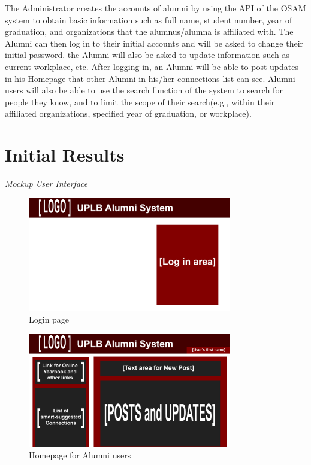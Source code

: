 \documentclass[journal]{./IEEE/IEEEtran}
\begin{document}
		The Administrator creates the accounts of alumni by using the API of the OSAM system to obtain basic information such as full name, student number, year of graduation, and organizations that the alumnus/alumna is affiliated with.
		The Alumni can then log in to their initial accounts and will be asked to change their initial password. the Alumni will also be asked to update information such as current workplace, etc. After logging in, an Alumni will be able to post updates in his Homepage that other Alumni in his\slash her connections list can see. Alumni users will also be able to use the search function of the system to search for people they know, and to limit the scope of their search(e.g., within their affiliated organizations, specified year of graduation, or workplace). 
\section{Initial Results}
{\setlength{\parindent}{0pt}
\setlength{\parskip}{\baselineskip}
\textit{Mockup User Interface}}

\begin{figure}[H]
\begin{center}
		\includegraphics[height=50mm]{Images/MockupUI/Index.png}
		\caption{Login page}
\end{center}
\end{figure} 

\begin{figure}[H]
\begin{center}
\includegraphics[height=50mm]{Images/MockupUI/UserHome.png}
\caption{Homepage for Alumni users}
\end{center}
\end{figure}
\end{document}

